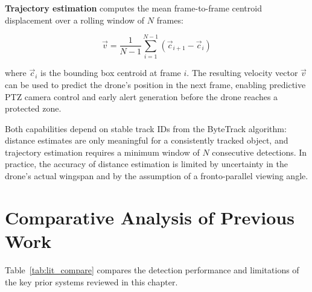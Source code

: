 \documentclass[12pt,a4paper]{report}
\begin{document}
\textbf{Trajectory estimation} computes the mean frame-to-frame centroid
displacement over a rolling window of $N$ frames:

\begin{equation}
\vec{v} = \frac{1}{N-1} \sum_{i=1}^{N-1} \left( \vec{c}_{i+1} - \vec{c}_i \right)
\end{equation}

where $\vec{c}_i$ is the bounding box centroid at frame $i$. The resulting velocity
vector $\vec{v}$ can be used to predict the drone's position in the next frame,
enabling predictive PTZ camera control and early alert generation before the drone
reaches a protected zone.

Both capabilities depend on stable track IDs from the ByteTrack algorithm: distance
estimates are only meaningful for a consistently tracked object, and trajectory
estimation requires a minimum window of $N$ consecutive detections. In practice,
the accuracy of distance estimation is limited by uncertainty in the drone's actual
wingspan and by the assumption of a fronto-parallel viewing angle.

\section{Comparative Analysis of Previous Work}

Table~\ref{tab:lit_compare} compares the detection performance and limitations
of the key prior systems reviewed in this chapter.
\end{document}
